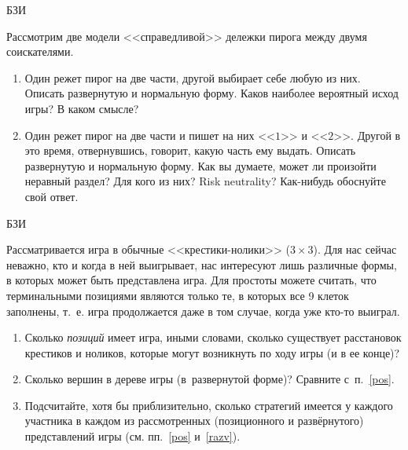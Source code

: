 \begin{problem}
\begin{source}
БЗИ
\end{source} Рассмотрим две модели
<<справедливой>> дележки пирога между двумя соискателями.

\begin{enumerate}

\item Один режет пирог на две части, другой выбирает себе
любую из них. Описать развернутую и нормальную форму. Каков
наиболее вероятный исход игры? {\red В каком смысле?}

\item Один режет пирог на две части и пишет на них <<$1$>>
и <<$2$>>. Другой в это время, отвернувшись, говорит, какую
часть ему выдать. Описать развернутую и нормальную форму.
Как вы думаете, может ли произойти неравный раздел? {\red Для кого из них?  Risk neutrality?}
Как-нибудь обоснуйте свой ответ.

\end{enumerate}

\begin{sol}
\end{sol}
\end{problem}




\begin{problem}
\begin{source}
БЗИ
\end{source} Рассматривается игра в
обычные <<крестики-нолики>> (${3\times 3}$). Для нас сейчас неважно, 
кто и когда в ней
выигрывает, нас интересуют лишь различные формы, в которых
может быть представлена игра. Для простоты можете считать,
что терминальными позициями являются только те, в которых
все 9 клеток заполнены, т.~е. игра продолжается даже в том случае, когда 
уже кто-то выиграл.

\begin{enumerate}

\item\label{pos} Сколько {\it позиций} имеет игра, иными
словами, сколько существует расстановок крестиков и
ноликов, которые могут возникнуть по ходу игры (и в ее
конце)?

\item\label{razv} Сколько вершин в дереве игры
(в~развернутой форме)?  Сравните с~п.~\ref{pos}.

\item Подсчитайте, хотя бы приблизительно, сколько
стратегий имеется у каждого участника в каждом из
рассмотренных (позиционного и развёрнутого) представлений игры (см. пп.~\ref{pos}
и~\ref{razv}).

\end{enumerate}






\begin{sol}

\end{sol}
\end{problem}



